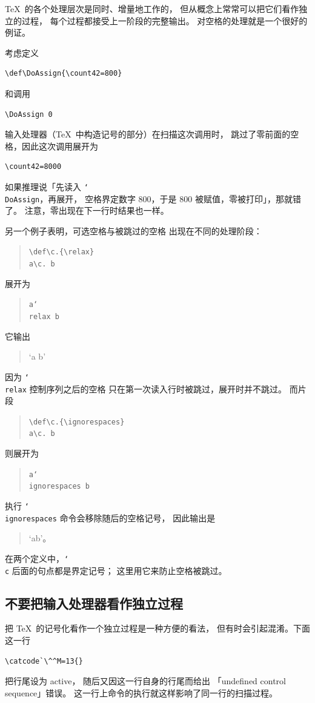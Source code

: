 \documentclass[a4paper]{rapport3}
\def\nl{\protect\\}\def\n#1{{\tt #1}}\def\cs#1{{\tt\char`\\#1}}\let\csc\cs
\newenvironment{disp}{\begin{quotation}}{\end{quotation}}
\begin{document}
\TeX\ 的各个处理层次是同时、增量地工作的，
\awp
但从概念上常常可以把它们看作独立的过程，
每个过程都接受上一阶段的完整输出。
对空格的处理就是一个很好的例证。

考虑定义
\begin{verbatim}
\def\DoAssign{\count42=800}
\end{verbatim}
和调用
\begin{verbatim}
\DoAssign 0
\end{verbatim}
输入处理器（\TeX\ 中构造记号的部分）在扫描这次调用时，
跳过了零前面的空格，因此这次调用展开为
\begin{verbatim}
\count42=8000
\end{verbatim}
如果推理说「先读入 \cs{DoAssign}，再展开，
空格界定数字 800，于是 800 被赋值，零被打印」，那就错了。
注意，零出现在下一行时结果也一样。

另一个例子表明，可选空格与被跳过的空格
出现在不同的处理阶段：
\begin{disp}\verb>\def\c.{\relax}>\nl
     \verb>a\c.>{\tt{} b}\end{disp}
展开为
\begin{disp}\n{a\cs{relax} b}\end{disp}
它输出
\begin{disp} `a b'\end{disp}
因为 \cs{relax} 控制序列之后的空格
只在第一次读入行时被跳过，展开时并不跳过。
而片段
\begin{disp} \verb-\def\c.{\ignorespaces}-\nl \verb-a\c. b-\end{disp}
则展开为
\begin{disp}\n{a\cs{ignorespaces} b}\end{disp}
执行 \cs{ignorespaces} 命令会移除随后的空格记号，
因此输出是 \begin{disp} `ab'。\end{disp}
在两个定义中，\cs{c} 后面的句点都是界定记号；
这里用它来防止空格被跳过。

\subsection{不要把输入处理器看作独立过程}

把 \TeX\ 的记号化看作一个独立过程是一种方便的看法，
但有时会引起混淆。下面这一行
\begin{verbatim}
\catcode`\^^M=13{}
\end{verbatim}
\awp
把行尾设为 active，
随后又因这一行自身的行尾而给出
「undefined control sequence」错误。
这一行上命令的执行就这样影响了同一行的扫描过程。
\end{document}
